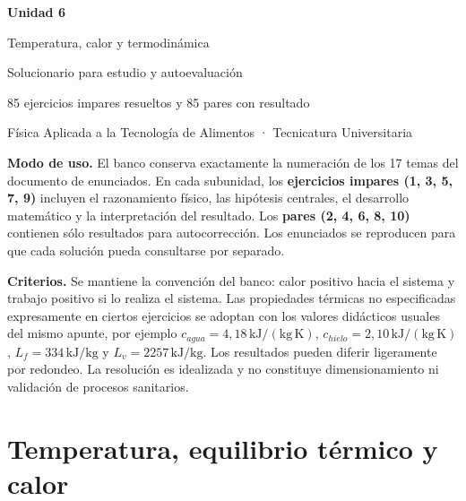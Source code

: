 \documentclass[11pt,a4paper]{article}
\begin{document}
\begin{center}
{\color{azulUT}\Huge\bfseries Unidad 6}\par\medskip
{\LARGE Temperatura, calor y termodinámica}\par\medskip
{\large Solucionario para estudio y autoevaluación}\par\medskip
{\large 85 ejercicios impares resueltos y 85 pares con resultado}\par\vspace{4mm}
Física Aplicada a la Tecnología de Alimentos · Tecnicatura Universitaria
\end{center}
\begin{consigna}
\textbf{Modo de uso.} El banco conserva exactamente la numeración de los 17 temas del documento de enunciados. En cada subunidad, los \textbf{ejercicios impares (1, 3, 5, 7, 9)} incluyen el razonamiento físico, las hipótesis centrales, el desarrollo matemático y la interpretación del resultado. Los \textbf{pares (2, 4, 6, 8, 10)} contienen sólo resultados para autocorrección. Los enunciados se reproducen para que cada solución pueda consultarse por separado. 
\end{consigna}
\textbf{Criterios.} Se mantiene la convención del banco: calor positivo hacia el sistema y trabajo positivo si lo realiza el sistema. Las propiedades térmicas no especificadas expresamente en ciertos ejercicios se adoptan con los valores didácticos usuales del mismo apunte, por ejemplo $c_{agua}=4{,}18\,\mathrm{kJ/(kg\,K)}$, $c_{hielo}=2{,}10\,\mathrm{kJ/(kg\,K)}$, $L_f=334\,\mathrm{kJ/kg}$ y $L_v=2257\,\mathrm{kJ/kg}$. Los resultados pueden diferir ligeramente por redondeo. La resolución es idealizada y no constituye dimensionamiento ni validación de procesos sanitarios.
\par
\tableofcontents\newpage

\section{Temperatura, equilibrio térmico y calor}

\begin{center}\end{center}
\end{document}
